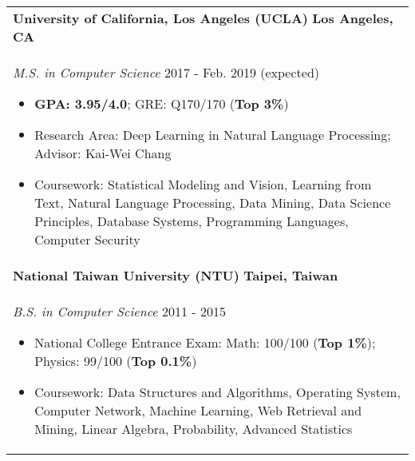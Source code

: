 \documentclass[letterpaper,11pt]{article} %
\begin{document}
{%
\begin{tabular}{p{18.5cm}}
{\bf{University of California, Los Angeles (UCLA)}}  \hfill \bf{Los Angeles, CA}\\
{\it M.S. in Computer Science} \hfill  2017 - Feb. 2019 (expected)
\begin{itemize}
\item \textbf{GPA: 3.95/4.0}; GRE: Q170/170 (\textbf{Top 3\%})
\item Research Area: Deep Learning in Natural Language Processing; Advisor: Kai-Wei Chang 
\item Coursework: Statistical Modeling and Vision, Learning from Text, Natural Language Processing, Data Mining, Data Science Principles, Database Systems, Programming Languages, Computer Security \vspace*{-\baselineskip}%
\end{itemize}\\ 
\vspace{.1mm}
%
{\bf{National Taiwan University (NTU)}} \hfill \bf{Taipei, Taiwan}\\
{\it B.S. in Computer Science} \hfill 2011 - 2015
\begin{itemize}
\item National College Entrance Exam:  Math: 100/100 (\textbf{Top 1\%}); Physics: 99/100 (\textbf{Top 0.1\%})
\item Coursework: Data Structures and Algorithms, Operating System, Computer Network, Machine Learning, Web Retrieval and Mining, Linear Algebra, Probability, Advanced Statistics \vspace*{-\baselineskip} 
\end{itemize} 
\end{tabular}

}
\end{document}
